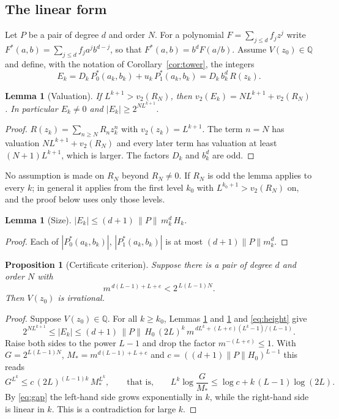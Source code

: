 \documentclass[11pt,reqno]{amsart}
\newtheorem{proposition}[theorem]{Proposition}
\newtheorem{lemma}[theorem]{Lemma}
\theoremstyle{definition}
\theoremstyle{remark}
\newcommand{\Q}{\mathbb{Q}}
\newcommand{\vt}{v_2}
\begin{document}
\subsection{The linear form}
Let $P$ be a pair of degree $d$ and order $N$.  For a polynomial
$F=\sum_{j\le d}f_jz^{j}$ write $F^{*}(a,b)=\sum_{j\le d}f_ja^{j}b^{d-j}$, so
that $F^{*}(a,b)=b^{d}F(a/b)$.  Assume $V(z_0)\in\Q$ and define, with the
notation of Corollary~\ref{cor:tower}, the integers
\[
  E_k=D_k\,P_0^{*}(a_k,b_k)+u_k\,P_1^{*}(a_k,b_k)=D_k\,b_k^{d}\,R(z_k).
\]

\begin{lemma}[Valuation]\label{lem:valuation}
If $L^{k+1}>\vt(R_N)$, then $\vt(E_k)=N L^{k+1}+\vt(R_N)$.  In particular
$E_k\ne 0$ and $|E_k|\ge 2^{NL^{k+1}}$.
\end{lemma}

\begin{proof}
$R(z_k)=\sum_{n\ge N}R_nz_k^{n}$ with $\vt(z_k)=L^{k+1}$.  The term $n=N$ has
valuation $NL^{k+1}+\vt(R_N)$ and every later term has valuation at least
$(N+1)L^{k+1}$, which is larger.  The factors $D_k$ and $b_k^{d}$ are odd.
\end{proof}

No assumption is made on $R_N$ beyond $R_N\ne 0$.  If $R_N$ is odd the
lemma applies to every $k$; in general it applies from the first level $k_0$
with $L^{k_0+1}>\vt(R_N)$ on, and the proof below uses only those levels.

\begin{lemma}[Size]\label{lem:size}
$|E_k|\le(d+1)\,\|P\|\,m_k^{d}\,H_k$.
\end{lemma}

\begin{proof}
Each of $|P_0^{*}(a_k,b_k)|$, $|P_1^{*}(a_k,b_k)|$ is at most
$(d+1)\|P\|m_k^{d}$.
\end{proof}

\begin{proposition}[Certificate criterion]\label{prop:criterion}
Suppose there is a pair of degree $d$ and order $N$ with
\begin{equation}\label{eq:gap}
  m^{\,d(L-1)+L+e}<2^{\,L(L-1)N}.
\end{equation}
Then $V(z_0)$ is irrational.
\end{proposition}

\begin{proof}
Suppose $V(z_0)\in\Q$.  For all $k\ge k_0$, Lemmas \ref{lem:valuation} and
\ref{lem:size} and \eqref{eq:height} give
\[
  2^{NL^{k+1}}\le|E_k|\le
  (d+1)\,\|P\|\,H_0\,(2L)^{k}\,m^{\,dL^{k}+(L+e)(L^{k}-1)/(L-1)} .
\]
Raise both sides to the power $L-1$ and drop the factor
$m^{-(L+e)}\le 1$.  With $G=2^{L(L-1)N}$, $M_*=m^{d(L-1)+L+e}$ and
$c=((d+1)\|P\|H_0)^{L-1}$ this reads
\[
  G^{L^{k}}\le c\,(2L)^{(L-1)k}\,M_*^{L^{k}},\qquad\text{that is,}\qquad
  L^{k}\log\frac{G}{M_*}\le\log c+k\,(L-1)\log(2L).
\]
By \eqref{eq:gap} the left-hand side grows exponentially in $k$, while the
right-hand side is linear in $k$.  This is a contradiction for large $k$.
\end{proof}
\end{document}
